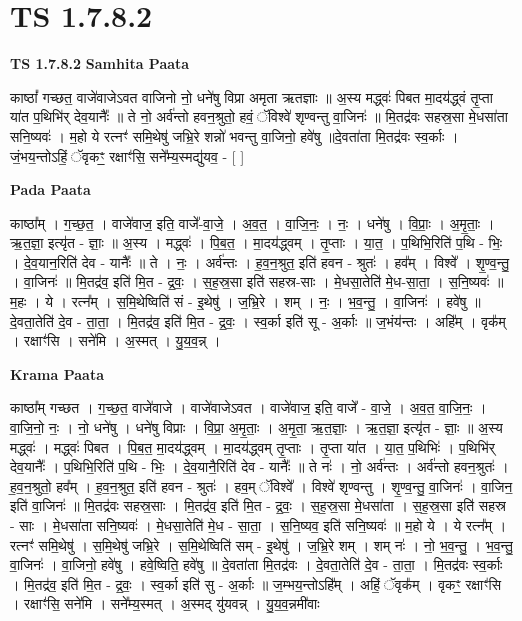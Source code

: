 \documentclass[17pt]{extarticle}
\begin{document}
\section*{ TS 1.7.8.2 }

\textbf{TS 1.7.8.2 } \newline
\textbf{Samhita Paata} \newline

काष्ठां᳚ गच्छत॒ वाजे॑वाजेऽवत वाजिनो नो॒ धने॑षु विप्रा अमृता ऋतज्ञाः ॥ अ॒स्य मद्ध्वः॑ पिबत मा॒दय॑द्ध्वं तृ॒प्ता या॑त प॒थिभि॑र् देव॒यानैः᳚ ॥ ते नो॒ अर्व॑न्तो हवन॒श्रुतो॒ हवं॒ ॅविश्वे॑ शृण्वन्तु वा॒जिनः॑ ॥ मि॒तद्र॑वः सहस्र॒सा मे॒धसा॑ता सनि॒ष्यवः॑ । म॒हो ये रत्नꣳ॑ समि॒थेषु॑ जभ्रि॒रे शन्नो॑ भवन्तु वा॒जिनो॒ हवे॑षु ॥दे॒वता॑ता मि॒तद्र॑वः स्व॒र्काः । जं॒भय॒न्तोऽहिं॒ ॅवृकꣳ॒॒ रक्षाꣳ॑सि॒ सने᳚म्य॒स्मद्यु॑यव॒ - [ ] \newline

\textbf{Pada Paata} \newline

काष्ठा᳚म् । ग॒च्छ॒त॒ । वाजे॑वाज॒ इति॒ वाजे᳚-वा॒जे॒ । अ॒व॒त॒ । वा॒जि॒नः॒ । नः॒ । धने॑षु । वि॒प्राः॒ । अ॒मृ॒ताः॒ । ऋ॒त॒ज्ञा॒ इत्यृ॑त - ज्ञाः॒ ॥ अ॒स्य । मद्ध्वः॑ । पि॒ब॒त॒ । मा॒दय॑द्ध्वम् । तृ॒प्ताः । या॒त॒ । प॒थिभि॒रिति॑ प॒थि - भिः॒ । दे॒व॒यान॒रिति॑ देव - यानैः᳚ ॥ ते । नः॒ । अर्व॑न्तः । ह॒व॒न॒श्रुत॒ इति॑ हवन - श्रुतः॑ । हव᳚म् । विश्वे᳚ । शृ॒ण्व॒न्तु॒ । वा॒जिनः॑ ॥ मि॒तद्र॑व॒ इति॑ मि॒त - द्र॒वः॒ । स॒ह॒स्र॒सा इति॑ सहस्र-साः । मे॒धसा॒तेति॑ मे॒ध-सा॒ता॒ । स॒नि॒ष्यवः॑ ॥ म॒हः । ये । रत्न᳚म् । स॒मि॒थेष्विति॑ सं - इ॒थेषु॑ । ज॒भ्रि॒रे । शम् । नः॒ । भ॒व॒न्तु॒ । वा॒जिनः॑ । हवे॑षु ॥ दे॒वता॒तेति॑ दे॒व - ता॒ता॒ । मि॒तद्र॑व॒ इति॑ मि॒त - द्र॒वः॒ । स्व॒र्का इति॑ सू - अ॒र्काः ॥ ज॒भंय॑न्तः । अहि᳚म् । वृक᳚म् । रक्षाꣳ॑सि । सने॑मि । अ॒स्मत् । यु॒य॒व॒न्न् ।  \newline


\textbf{Krama Paata} \newline

काष्ठा᳚म् गच्छत । ग॒च्छ॒त॒ वाजे॑वाजे । वाजे॑वाजेऽवत । वाजे॑वाज॒ इति॒ वाजे᳚ - वा॒जे॒ । अ॒व॒त॒ वा॒जि॒नः॒ । वा॒जि॒नो॒ नः॒ । नो॒ धने॑षु । धने॑षु विप्राः । वि॒प्रा॒ अ॒मृ॒ताः॒ । अ॒मृ॒ता॒ ऋ॒त॒ज्ञाः॒ । ऋ॒त॒ज्ञा॒ इत्यृ॑त - ज्ञाः॒ ॥ अ॒स्य मद्ध्वः॑ । मद्ध्वः॑ पिबत । पि॒ब॒त॒ मा॒दय॑द्ध्वम् । मा॒दय॑द्ध्वम् तृ॒प्ताः । तृ॒प्ता या॑त । या॒त॒ प॒थिभिः॑ । प॒थिभि॑र् देव॒यानैः᳚ । प॒थिभि॒रिति॑ प॒थि - भिः॒ । दे॒व॒यानै॒रिति॑ देव - यानैः᳚ ॥ ते नः॑ । नो॒ अर्व॑न्तः । अर्व॑न्तो हवन॒श्रुतः॑ । ह॒व॒न॒श्रुतो॒ हव᳚म् । ह॒व॒न॒श्रुत॒ इति॑ हवन - श्रुतः॑ । हव॒म् ॅविश्वे᳚ । विश्वे॑ शृण्वन्तु । शृ॒ण्व॒न्तु॒ वा॒जिनः॑ । वा॒जिन॒ इति॑ वा॒जिनः॑ ॥ मि॒तद्र॑वः सहस्र॒साः । मि॒तद्र॑व॒ इति॑ मि॒त - द्र॒वः॒ । स॒ह॒स्र॒सा मे॒धसा॑ता । स॒ह॒स्र॒सा इति॑ सहस्र - साः । मे॒धसा॑ता सनि॒ष्यवः॑ । मे॒धसा॒तेति॑ मे॒ध - सा॒ता॒ । स॒नि॒ष्यव॒ इति॑ सनि॒ष्यवः॑ ॥ म॒हो ये । ये रत्न᳚म् । रत्नꣳ॑ समि॒थेषु॑ । स॒मि॒थेषु॑ जभ्रि॒रे । स॒मि॒थेष्विति॑ सम् - इ॒थेषु॑ । ज॒भ्रि॒रे शम् । शम् नः॑ । नो॒ भ॒व॒न्तु॒ । भ॒व॒न्तु॒ वा॒जिनः॑ । वा॒जिनो॒ हवे॑षु । हवे॒ष्विति॒ हवे॑षु ॥ दे॒वता॑ता मि॒तद्र॑वः । दे॒वता॒तेति॑ दे॒व - ता॒ता॒ । मि॒तद्र॑वः स्व॒र्काः । मि॒तद्र॑व॒ इति॑ मि॒त - द्र॒वः॒ । स्व॒र्का इति॑ सु - अ॒र्काः ॥ ज॒म्भय॒न्तोऽहि᳚म् । अहिं॒ ॅवृक᳚म् । वृकꣳ॒॒ रक्षाꣳ॑सि । रक्षाꣳ॑सि॒ सने॑मि । सने᳚म्य॒स्मत् । अ॒स्मद् यु॑यवन्न् । यु॒य॒व॒न्नमी॑वाः \newline
\end{document}
